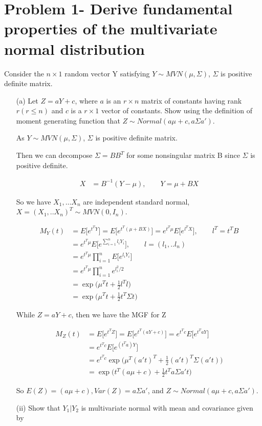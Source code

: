 
\section{Problem 1- Derive fundamental properties of the multivariate normal distribution}

Consider the $n \times 1$ random vector Y satisfying $Y \sim MVN (\mu, \Sigma)$, $\Sigma$ is positive definite matrix.

\begin{itemize}
	\item [(a)] Let $Z = aY + c$, where $a$ is an $r \times n$ matrix of constants having rank $r (r \leq n)$ and $c$ is a $r \times 1$ vector of constants. Show using the definition of moment generating function that
	$Z \sim Normal (a \mu + c, a \Sigma a')$.  
	
As $Y \sim MVN(\mu, \Sigma)$, $\Sigma$ is positive definite matrix. 

Then we can decompose $\Sigma = B B^T$ for some nonsingular matrix B since $\Sigma$ is positive definite. 

 \begin{align*}
    X &= B^{-1} (Y- \mu), \qquad Y = \mu + B X 
\end{align*}

So we have $X_1, … X_n$ are independent standard normal, $X = (X_1,.. X_n)^T \sim MVN(0, I_n)$. 

 \begin{align*}
    M_Y(t) &=  E\Big[ e^{t^T Y}\Big ]=  E\Big[ e^{t^T (\mu + B X)}\Big ] = e^{t^T \mu} E \Big[ e^{l^T X} \Big], \qquad l^T = t^T B \\
    &= e^{t^T \mu} E \Big[ e^{\sum_{i=1}^n l_i Y_i} \Big], \qquad l= (l_1,.. l_n)\\
    &= e^{t^T \mu} \prod_{i=1}^n E \Big[ e^{ l_i Y_i} \Big] \\
    &= e^{t^T \mu} \prod_{i=1}^n e^{l_i^2/2}\\
    &= \exp \Big( \mu^T t + \frac{1}{2} l^T l \Big) \\
    &= \exp \Big( \mu^T t + \frac{1}{2} t^T \Sigma t \Big)
\end{align*}

While $Z = aY + c$, then we have the MGF for Z

 \begin{align*}
    M_Z(t) &=  E\Big[ e^{t^T Z}\Big ]=  E\Big[ e^{t^T (aY + c)}\Big ] = e^{t^T c} E \Big[ e^{t^T aY} \Big] \\
    &= e^{t^T c} E \Big[ e^{ (t^T a)Y} \Big] \\
    &= e^{t^T c} \exp \Big( \mu^T (a' t)^T + \frac{1}{2} (a' t)^T \Sigma (a' t) \Big) \\
    &= \exp \Big( t^T (a \mu + c) + \frac{1}{2} t^T a \Sigma a' t \Big) 
\end{align*}	

So $E(Z) = (a \mu + c), Var(Z) = a \Sigma a'$, and $Z \sim Normal (a \mu + c, a \Sigma a')$.

\item[(ii)] Show that $Y_1|Y_2$ is multivariate normal with mean and covariance given by


\end{itemize}

